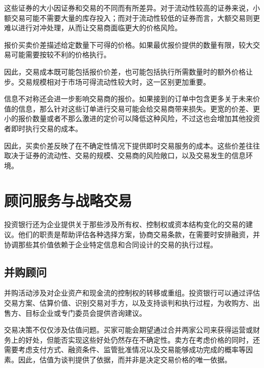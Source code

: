 这些证券的大小因证券和交易的不同而有所差异。对于流动性较高的证券来说，小额交易可能不需要大量的库存投入；而对于流动性较低的证券而言，大额交易则更难以进行对冲处理，从而让交易商面临更大的价格风险。

\begin{tcolorbox}[
  enhanced,
  breakable,
  colback=white,
  colframe=FinanceBlue,
  boxrule=0.7pt,
  sharp corners,
  borderline west={2.2pt}{0pt}{FinanceBlue},
  title=\textbf{财务展望：所报价差并非全部交易成本的体现},
  coltitle=white,
  colbacktitle=FinanceBlue,
  fonttitle=\bfseries,
  before skip=1.2em,
  after skip=1.2em
]

报价买卖价差描述给定数量下可得的价格。如果最优报价提供的数量有限，较大交易可能需要按较不利的价格执行。

因此，交易成本既可能包括报价价差，也可能包括执行所需数量时的额外价格让步。交易规模相对于市场可得流动性较大时，这一区别更加重要。

\end{tcolorbox}

信息不对称还会进一步影响交易商的报价。如果接到的订单中包含更多关于未来价值的信息，那么针对这些订单进行交易可能会给交易商带来损失。更宽的价差、更小的报价数量或者不那么激进的定价可以降低这种风险，不过这也会增加其他投资者即时执行交易的成本。

因此，买卖价差反映了在不确定性情况下提供即时交易服务的成本。这些价差往往取决于证券的流动性、交易的规模、交易商的风险敞口，以及交易发生的信息环境。

\section{顾问服务与战略交易}

投资银行还为企业提供关于那些涉及所有权、控制权或资本结构变化的交易的建议。他们的职责是帮助评估各种选择方案，协商交易条款，在需要时安排融资，并协调那些其价值依赖于企业特定信息和合同设计的交易的执行过程。

\subsection{并购顾问}

并购活动涉及对企业资产和现金流的控制权的转移或重组。投资银行可以通过评估交易方案、估算价值、识别交易对手方，以及支持谈判和执行过程，为收购方、出售方、目标企业或专门委员会提供咨询建议。

交易决策不仅仅涉及估值问题。买家可能会期望通过合并两家公司来获得运营或财务上的好处，但能否实现这些好处仍然存在不确定性。卖方在考虑价格的同时，还需要考虑支付方式、融资条件、监管批准情况以及交易能够成功完成的概率等因素。因此，估值为谈判提供了依据，而并非是决定交易价格的唯一依据。

